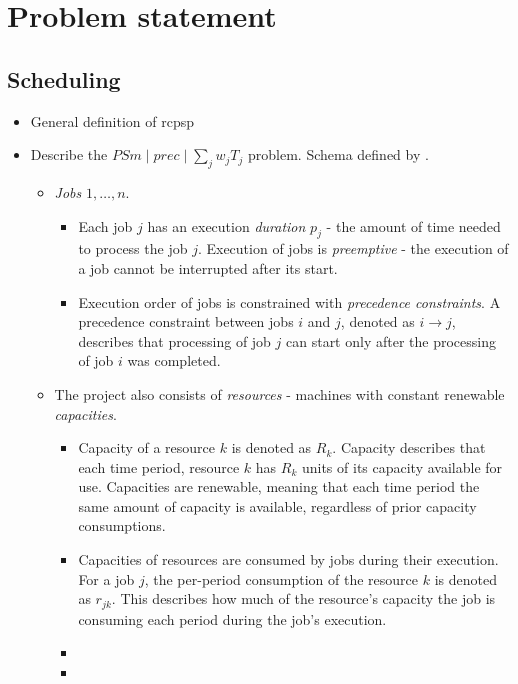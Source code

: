\chapter{Problem statement}

\section{Scheduling}

\begin{itemize}
    \item General definition of \ac{rcpsp}

    \item Describe the $PSm \;|\; prec \;|\; \sum_{j} w_j T_j$ problem.
        Schema defined by \citet{BRUCKER1999}.
    \begin{itemize}
        \item \emph{Jobs} $1, \dots, n$.
        \begin{itemize}
            \item Each job $j$ has an execution \emph{duration} $p_j$ - the amount of time needed to process
                the job $j$. Execution of jobs is \emph{preemptive} - the execution of a job cannot be interrupted
                after its start.
            \item Execution order of jobs is constrained with \emph{precedence constraints}.
                A precedence constraint between jobs $i$ and $j$, denoted as $i \rightarrow j$,
                describes that processing of job $j$ can start only after the processing of job $i$
                was completed.
        \end{itemize}
        
        \item The project also consists of \emph{resources} - machines with constant renewable \emph{capacities}.
        \begin{itemize}
            \item Capacity of a resource $k$ is denoted as $R_k$. Capacity describes that each time period,
                resource $k$ has $R_k$ units of its capacity available for use. Capacities are renewable,
                meaning that each time period the same amount of capacity is available, regardless of prior
                capacity consumptions.
            \item Capacities of resources are consumed by jobs during their execution. For a job $j$,
                the per-period consumption of the resource $k$ is denoted as $r_{jk}$. This describes how much
                of the resource's capacity the job is consuming each period during the job's execution.
            \item {}
            \item {}
        \end{itemize}


\end{itemize}
\end{itemize}
